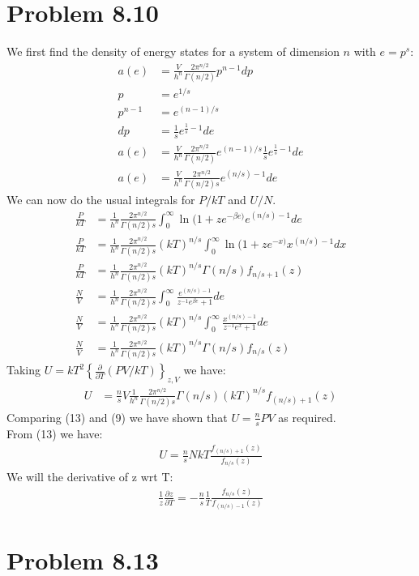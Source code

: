 \documentclass[a4paper,11pt]{article}
\numberwithin{equation}{section}
\begin{document}
\section{Problem 8.10}
We first find the density of energy states for a system of dimension $n$ with $e=p^s$:
\begin{align}
 a(e) &= \frac{V}{h^n}\frac{2\pi^{n/2}}{\Gamma(n/2)}p^{n-1}dp\\
 p &=e^{1/s}\\
 p^{n-1} &= e^{(n-1)/s}\\
 dp &= \frac{1}{s}e^{\frac{1}{s}-1}de\\
 a(e) &= \frac{V}{h^n}\frac{2\pi^{n/2}}{\Gamma(n/2)}e^{(n-1)/s}\frac{1}{s}e^{\frac{1}{s}-1}de\\
 a(e) &= \frac{V}{h^n}\frac{2\pi^{n/2}}{\Gamma(n/2)s}e^{(n/s)-1} de
\end{align}
We can now do the usual integrals for $P/kT$ and $U/N$.  
\begin{align}
 \frac{P}{kT} &= \frac{1}{h^n}\frac{2\pi^{n/2}}{\Gamma(n/2)s}\int_0^\infty \ln{(1+ze^{-\beta e)}}e^{(n/s)-1} de\\
 \frac{P}{kT} &= \frac{1}{h^n}\frac{2\pi^{n/2}}{\Gamma(n/2)s}(kT)^{n/s}\int_0^\infty \ln{(1+ze^{-x)}}x^{(n/s)-1} dx\\
 \frac{P}{kT} &= \frac{1}{h^n}\frac{2\pi^{n/2}}{\Gamma(n/2)s}(kT)^{n/s}\Gamma(n/s) f_{n/s+1}(z)\\
 \frac{N}{V}  &= \frac{1}{h^n}\frac{2\pi^{n/2}}{\Gamma(n/2)s}\int_0^\infty \frac{e^{(n/s)-1}}{z^{-1}e^{\beta e}+1} de\\
 \frac{N}{V}  &= \frac{1}{h^n}\frac{2\pi^{n/2}}{\Gamma(n/2)s}(kT)^{n/s}\int_0^\infty \frac{x^{(n/s)-1}}{z^{-1}e^{x}+1} de\\
 \frac{N}{V}  &= \frac{1}{h^n}\frac{2\pi^{n/2}}{\Gamma(n/2)s}(kT)^{n/s}\Gamma(n/s) f_{n/s}(z)
\end{align}
Taking $U=kT^2\left\{\frac{\partial}{\partial T}(PV/kT) \right\}_{z,V}$ we have:
\begin{align}
 U &= \frac{n}{s}V\frac{1}{h^n}\frac{2\pi^{n/2}}{\Gamma(n/2)s}\Gamma(n/s)(kT)^{n/s} f_{(n/s)+1}(z)
\end{align}
Comparing (13) and (9) we have shown that $U=\frac{n}{s}PV$ as required.
\\
From (13) we have:
\begin{align}
 U=\frac{n}{s}NkT\frac{f_{(n/s)+1}(z)}{f_{n/s}(z)}
\end{align}
We will the derivative of z wrt T:
\begin{align}
 \frac{1}{z}\frac{\partial z}{\partial T} = -\frac{n}{s}\frac{1}{T}\frac{f_{n/s}(z)}{f_{(n/s)-1}(z)}
\end{align}


\section{Problem 8.13}
\end{document}
